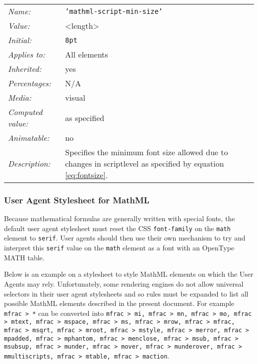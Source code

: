 \begin{table}
\begin{tabular}{ll}
  \emph{Name:} & {\tt 'mathml-script-min-size'} \\
  \emph{Value:} & \textless length\textgreater \\
  \emph{Initial:} & {\tt 8pt} \\
  \emph{Applies to:} & All elements \\
  \emph{Inherited:} & yes \\
  \emph{Percentages:} & N/A \\
  \emph{Media:} & visual \\
  \emph{Computed value:} & as specified \\
  \emph{Animatable:} & no \\
  \emph{Description:} & Specifies the minimum font size allowed due to changes
  in scriptlevel as specified by equation \ref{eq:fontsize}.
\end{tabular}
\label{tab:CSSScriptSizeMinSize}
\end{table}

\subsubsection{User Agent Stylesheet for MathML}\label{UAStylesheet}

Because mathematical formulas are generally written with special fonts, the
default user agent stylesheet must reset the CSS {\tt font-family} on the
{\tt math} element to {\tt serif}. User agents should then use their own
mechanism to try and interpret this {\tt serif} value on the {\tt math} element
as a font with an OpenType MATH table.

Below is an example on a stylesheet to style MathML elements on which the
User Agents may rely. Unfortunately, some rendering engines do not allow
universal selectors in their user agent stylesheets and so rules must be
expanded to list all possible MathML elements described in the present
document. For example {\tt mfrac > *} can be converted into
{\tt mfrac > mi, mfrac > mn, mfrac > mo, mfrac > mtext, mfrac > mspace,
mfrac > ms, mfrac > mrow, mfrac > mfrac, mfrac > msqrt, mfrac > mroot,
mfrac > mstyle, mfrac > merror, mfrac > mpadded, mfrac > mphantom,
mfrac > menclose, mfrac > msub, mfrac > msubsup, mfrac > munder, mfrac > mover,
mfrac > munderover, mfrac > mmultiscripts, mfrac > mtable, mfrac > maction}.

